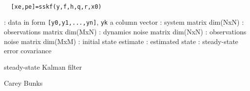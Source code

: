 
\begin{mandesc}
   \\ %
\end{mandesc}
\begin{calling_sequence}
\begin{verbatim}
  [xe,pe]=sskf(y,f,h,q,r,x0)  
\end{verbatim}
\end{calling_sequence}
\begin{parameters}
  \begin{varlist}
    : data in form \verb![y0,y1,...,yn]!, \verb!yk! a column vector
    : system matrix dim(NxN)
    : observations matrix dim(MxN)
    : dynamics noise matrix dim(NxN)
    : observations noise matrix dim(MxM)
    : initial state estimate
    : estimated state
    : steady-state error covariance
  \end{varlist}
\end{parameters}
\begin{mandescription}
  steady-state Kalman filter
\end{mandescription}
\begin{authors}
  Carey Bunks
\end{authors}
